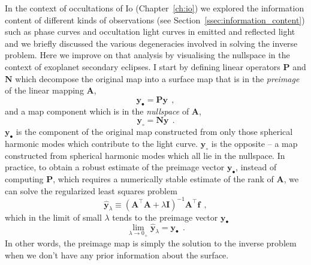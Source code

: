 \documentclass[12pt,dvipsnames]{report}
\renewcommand{\vec}[1]{\boldsymbol{\mathbf{#1}}}
\newcommand{\hquad}{~~}
\begin{document}
In the context of occultations of Io (Chapter~\ref{ch:io}) we explored the 
information content of different kinds of observations 
(see Section~\ref{ssec:information_content}) such as phase curves and occultation light curves 
in emitted and reflected light and we briefly discussed the various degeneracies involved 
in solving the inverse problem. Here we improve on that analysis by visualising the 
nullspace in the context of exoplanet secondary eclipses. 
I start by defining linear operators
$\mathbf{P}$ and $\mathbf{N}$ \citep[see Appendix A in][]{2021AJ....162..123L} which
decompose the original map into a surface map that is in the \emph{preimage} of the linear mapping
$\vec{A}$,
\begin{equation}
    \mathbf{y}_{\bullet}=\mathbf{P} \mathbf{y}
    \hquad,
\end{equation}
and a map component which is in the \emph{nullspace} of $\vec A$,
\begin{equation}
    \mathbf{y}_{\circ}=\mathbf{N} \mathbf{y}
    \hquad.
    \label{eq:preimage}
\end{equation}
$\mathbf{y}_{\bullet}$ is the component of the original map constructed from only those
spherical harmonic modes which contribute to the light curve. $\mathbf{y}_{\circ}$ is the
opposite -- a map constructed from spherical harmonic modes which all lie in the nullspace.
In practice, to obtain a robust estimate of the preimage vector $\mathbf{y}_{\bullet}$,
instead of computing $\mathbf{P}$, which requires a numerically stable estimate
of the rank of $\mathbf{A}$, 
we can solve the regularized least squares problem
\begin{equation}
    \hat{\mathbf{y}}_{\lambda}\equiv (\mathbf{A}^\intercal \mathbf{A} + \lambda \mathbf{I})^{-1} \mathbf{A}^\intercal \mathbf{f}
    \hquad,
    \label{eq:preimage_lsq}
\end{equation}
which in the limit of small $\lambda$ tends to the preimage vector $\mathbf{y}_{\bullet}$
\citep[see, for instance, ][]{hogg2021}
\begin{equation}
    \lim _{\lambda \rightarrow 0_{+}} \hat{\mathbf{y}}_{\lambda}=\mathbf{y}_{\boldsymbol{\bullet}}
    \hquad.
\end{equation}
In other words, the preimage map is simply the solution to the inverse problem when we don't have any
prior information about the surface.
\end{document}
